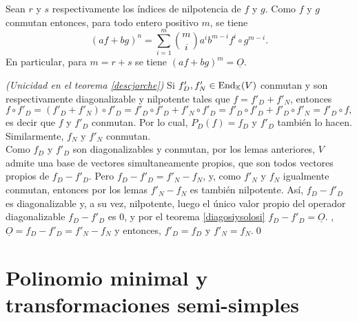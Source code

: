 \dem Sean $r$ y $s$ respectivamente los índices de nilpotencia de $f$ y $g$. Como $f$ y $g$ conmutan entonces, para todo entero positivo $m$, se tiene
$$ (af+bg)^n=\sum_{i=1}^m\binom{m}{i}a^ib^{m-i}f^i\circ g^{m-i}.$$
En particular, para $m=r+s$ se tiene $(af+bg)^m=\underline{O}$.

\dem\emph{(Unicidad en el teorema \ref{descjorche})} Si $f'_D,f'_N\in\operatorname{End}_{\mathbb{K}}(V)$ conmutan y son respectivamente diagonalizable y nilpotente tales que $f=f'_D+f'_N$, entonces
  \[
  f\circ f'_D=(f'_D+f'_N)\circ f'_D=f'_D\circ f'_D+f'_N\circ f'_D=f'_D\circ f'_D+f'_D\circ f'_N=f'_D\circ f,
  \]
  es decir que $f$ y $f'_D$ conmutan. Por lo cual, $P_D(f)=f_D$ y $f'_D$ tambi\'en lo hacen. Similarmente, $f_N$ y $f'_N$ conmutan.\\
  Como $f_D$ y $f'_D$ son diagonalizables y conmutan, por los lemas anteriores, $V$ admite una base de vectores simultaneamente propios, que son todos vectores propios de $f_D-f'_D$. Pero $f_D-f'_D=f'_N-f_N$, y, como $f'_N$ y $f_N$ igualmente conmutan, entonces por los lemas $f'_N-f_N$ es también nilpotente. As\'i, $f_D-f'_D$ es diagonalizable y, a su vez, nilpotente, luego el único valor propio del operador diagonalizable $f_D-f'_D$ es $0$, y por el teorema \ref{diagosiysolosi} $f_D-f'_D=\underline{O}$. , $\underline{O}=f_D-f'_D=f'_N-f_N$ y entonces, $f'_D=f_D$ y $f'_N=f_N$.\qed

\section{Polinomio minimal y transformaciones semi-simples}